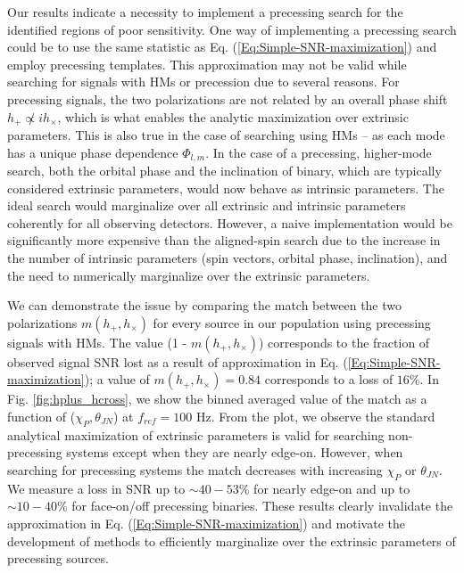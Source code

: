 Our results indicate a necessity to implement a precessing search for the identified regions of poor sensitivity. One way of implementing a precessing search could be to use the same statistic as Eq. (\ref{Eq:Simple-SNR-maximization}) and employ precessing templates. This approximation may not be valid while searching for signals with HMs or precession due to several reasons. For precessing signals, the two polarizations are not related by an overall phase shift $h_+ \not\propto i h_{\times}$, which is what enables the analytic maximization over extrinsic parameters. This is also true in the case of searching using HMs -- as each mode has a unique phase dependence $\Phi_{l,m}$. In the case of a precessing, higher-mode search, both the orbital phase and the inclination of binary, which are typically considered extrinsic parameters, would now behave as intrinsic parameters. The ideal search would marginalize over all extrinsic and intrinsic parameters coherently for all observing detectors. However, a naive implementation would be significantly more expensive than the aligned-spin search due to the increase in the number of intrinsic parameters (spin vectors, orbital phase, inclination), and the need to numerically marginalize over the extrinsic parameters. 

We can demonstrate the issue by comparing the match between the two polarizations $m(h_+, h_{\times})$ for every source in our population using precessing signals with HMs. The value (1 - $m(h_+, h_{\times})$) corresponds to the fraction of observed signal SNR lost as a result of approximation in Eq. (\ref{Eq:Simple-SNR-maximization}); a value of $m(h_+, h_{\times}) = 0.84$ corresponds to a loss of $16\%$. In Fig. \ref{fig:hplus_hcross}, we show the binned averaged value of the match as a function of ($\chi_P, \theta_{JN}$) at $f_{ref} = 100$ Hz. From the plot, we observe the standard analytical maximization of extrinsic parameters is valid for searching non-precessing systems except when they are nearly edge-on. However, when searching for precessing systems the match decreases with increasing $\chi_P$ or $\theta_{JN}$. We measure a loss in SNR up to $\sim 40-53\%$ for nearly edge-on and up to $\sim 10-40\%$ for face-on/off precessing binaries. These results clearly invalidate the approximation in Eq. (\ref{Eq:Simple-SNR-maximization}) and motivate the development of methods to efficiently marginalize over the extrinsic parameters of precessing sources.

